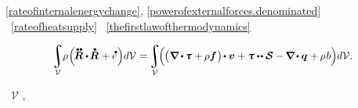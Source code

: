  \eqref{rateofinternalenergychange}, \eqref{powerofexternalforces.denominated} ~\eqref{rateofheatsupply} ~\eqref{thefirstlawofthermodynamics}
   

\nopagebreak\vspace{-0.15em}\begin{equation*}
\scalebox{0.95}{$%
\displaystyle\integral\displaylimits_{\mathcal{V}} \hspace{-0.55ex} \rho \hspace{-0.25ex} \left(^{\mathstrut} \hspace{-0.3ex} \mathdotdotabove{\bm{R}} \dotp \hspace{-0.23ex} \mathdotabove{\bm{R}} \hspace{.12ex} + \mathdotabove{e} \hspace{.1ex}
\right) \hspace{-0.4ex} d\mathcal{V}
$}
= \hspace{-0.33ex}
\scalebox{0.95}{$%
\displaystyle\integral\displaylimits_{\mathcal{V}} \hspace{-0.8ex} \left(^{\mathstrut} \hspace{-0.2ex}
\bigl( \hspace{.1ex} \boldnabla \hspace{-0.1ex} \dotp \hspace{-0.1ex} \cauchystress + \hspace{-0.1ex} \rho \bm{f} \hspace{.15ex} \bigr) \hspace{-0.25ex} \dotp \bm{v} \hspace{.1ex}
+ \cauchystress \dotdotp \strainratetensor
- \hspace{-0.16ex} \boldnabla \hspace{-0.15ex} \dotp \heatfluxvector \hspace{.1ex} + \hspace{-0.1ex} \rho \hspace{.2ex} b
\right) \hspace{-0.4ex} d\mathcal{V}
$}
.
\end{equation*}

\vspace{-0.16em}\noindent
{}  ~${\mathcal{V}}$ ,  

